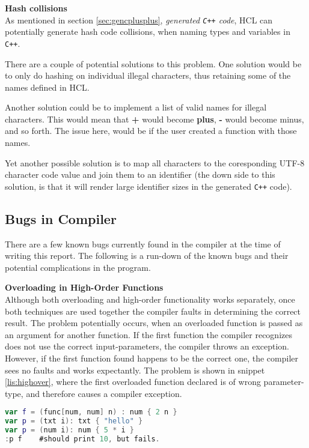 \textbf{Hash collisions}\\
As mentioned in section \ref{sec:gencplusplus}, \textit{generated \texttt{C++} code}, HCL can potentially generate hash code collisions, when naming types and variables in \texttt{C++}.

There are a couple of potential solutions to this problem.
One solution would be to only do hashing on individual illegal characters, thus retaining some of the names defined in HCL.

Another solution could be to implement a list of valid names for illegal characters.
This would mean that \textbf{+} would become \textbf{plus}, \textbf{-} would become minus, and so forth.
The issue here, would be if the user created a function with those names.

Yet another possible solution is to map all characters to the coresponding UTF-8 character code value and join them to an identifier (the down side to this solution, is that it will render large identifier sizes in the generated \texttt{C++} code).

\subsection{Bugs in Compiler}
There are a few known bugs currently found in the compiler at the time of writing this report. 
The following is a run-down of the known bugs and their potential complications in the program. 

\textbf{Overloading in High-Order Functions}\\
Although both overloading and high-order functionality works separately, once both techniques are used together the compiler faults in determining the correct result.
The problem potentially occurs, when an overloaded function is passed as an argument for another function. 
If the first function the compiler recognizes does not use the correct input-parameters, the compiler throws an exception.
However, if the first function found happens to be the correct one, the compiler sees no faults and works expectantly.
The problem is shown in snippet \ref{lis:highover}, where the first overloaded function declared is of wrong parameter-type, and therefore causes a compiler exception. 
\begin{lstlisting}[language=Kotlin,label=lis:highover,caption=Overloading in high-order functions problem.]
var f = (func[num, num] n) : num { 2 n }
var p = (txt i): txt { "hello" }
var p = (num i): num { 5 * i }
:p f 	#should print 10, but fails. 
\end{lstlisting}

